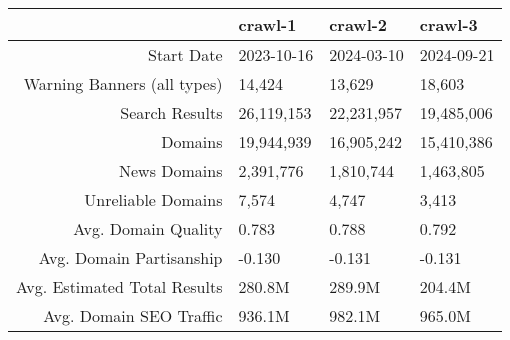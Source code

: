\begin{tabular}{>{\raggedright\arraybackslash}rlll}
\toprule
& \textbf{crawl-1} & \textbf{crawl-2} & \textbf{crawl-3} \\
\midrule
Start Date & 2023-10-16 & 2024-03-10 & 2024-09-21 \\
Warning Banners (all types) & 14,424 & 13,629 & 18,603 \\
Search Results & 26,119,153 & 22,231,957 & 19,485,006 \\
Domains & 19,944,939 & 16,905,242 & 15,410,386 \\
News Domains & 2,391,776 & 1,810,744 & 1,463,805 \\
Unreliable Domains & 7,574 & 4,747 & 3,413 \\
Avg. Domain Quality & 0.783 & 0.788 & 0.792 \\
Avg. Domain Partisanship & -0.130 & -0.131 & -0.131 \\
Avg. Estimated Total Results & 280.8M & 289.9M & 204.4M \\
Avg. Domain SEO Traffic & 936.1M & 982.1M & 965.0M \\
\bottomrule
\end{tabular}
